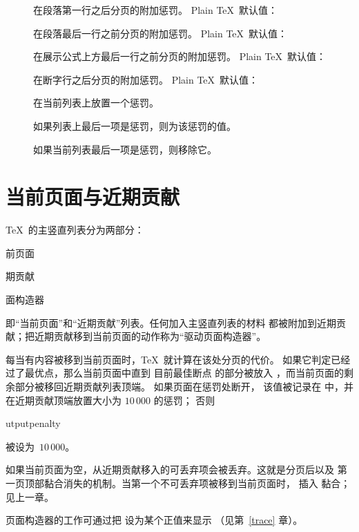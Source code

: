 \documentclass[a4paper]{rapport3}
\makeatletter
\newenvironment{inventory}{\begin{description}}{\end{description}}
\def\term#1\par{\index{#1}}
\def\cstoidx#1\par{\index{#1@\cs{#1}}}
\def\csidx#1{\cstoidx #1\par\cs{#1}}
\makeatother
\begin{document}
\begin{inventory}
\item [] 
      在段落第一行之后分页的附加惩罚。
      Plain \TeX\ 默认值：~

\item [] 
      在段落最后一行之前分页的附加惩罚。
      Plain \TeX\ 默认值：~

\item [] 
      在展示公式上方最后一行之前分页的附加惩罚。
      Plain \TeX\ 默认值：~

\item [] 
      在断字行之后分页的附加惩罚。
      Plain \TeX\ 默认值：~

\item []
      在当前列表上放置一个惩罚。
\item []
      如果列表上最后一项是惩罚，则为该惩罚的值。
\item []
      如果当前列表最后一项是惩罚，则移除它。

\end{inventory}

\section{当前页面与近期贡献}

\TeX\ 的主竖直列表分为两部分：
\term 当前页面\par\term 近期贡献\par
\term 页面构造器\par
即“当前页面”和“近期贡献”列表。任何加入主竖直列表的材料
都被附加到近期贡献；把近期贡献移到当前页面的动作称为“驱动页面构造器”。

每当有内容被移到当前页面时，\TeX\ 就计算在该处分页的代价。
如果它判定已经过了最优点，那么当前页面中直到
\altt 
目前最佳断点
的部分被放入 ，而当前页面的剩余部分被移回近期贡献列表顶端。
如果页面在惩罚处断开，
\label{break:penalty}%
该值被记录在  中，并在近期贡献顶端放置大小为 $10\,000$ 的惩罚；
否则 \csidx{outputpenalty} 被设为~$10\,000$。

如果当前页面为空，从近期贡献移入的可丢弃项会被丢弃。这就是分页后以及
第一页顶部黏合消失的机制。当第一个不可丢弃项被移到当前页面时，
插入  黏合；见上一章。

页面构造器的工作可通过把  设为某个正值来显示
（见第~\ref{trace} 章）。
\end{document}

